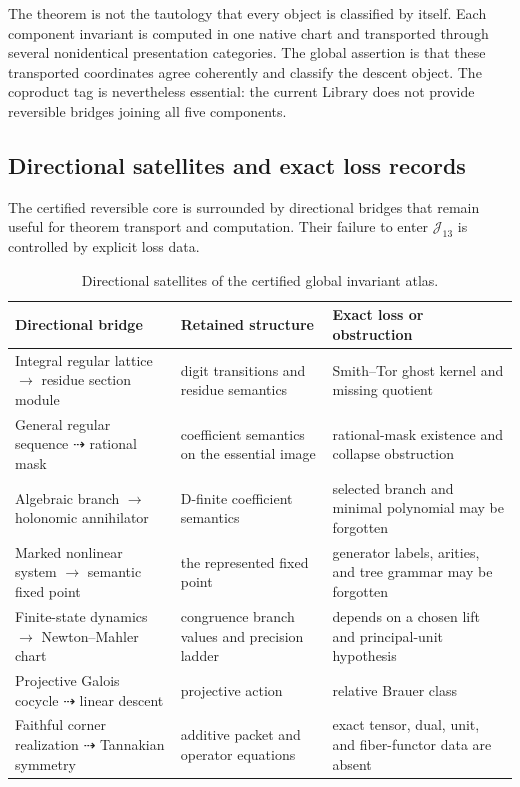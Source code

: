 \begin{remark}
The theorem is not the tautology that every object is classified by itself.  Each component invariant is computed in one native chart and transported through several nonidentical presentation categories.  The global assertion is that these transported coordinates agree coherently and classify the descent object.  The coproduct tag is nevertheless essential: the current Library does not provide reversible bridges joining all five components.
\end{remark}

\subsection{Directional satellites and exact loss records}
\label{subsec:block13-directional-satellites}

The certified reversible core is surrounded by directional bridges that remain useful for theorem transport and computation.  Their failure to enter \(\mathcal J_{13}\) is controlled by explicit loss data.

\begin{table}[htbp]
\centering
\caption{Directional satellites of the certified global invariant atlas.}
\label{tab:block13-directional-satellites}
\small
\begin{tabularx}{\textwidth}{@{}L{0.23\textwidth}L{0.19\textwidth}Y@{}}
\toprule
Directional bridge & Retained structure & Exact loss or obstruction\\
\midrule
Integral regular lattice \(\to\) residue section module & digit transitions and residue semantics & Smith--Tor ghost kernel and missing quotient\\
General regular sequence \(\dashrightarrow\) rational mask & coefficient semantics on the essential image & rational-mask existence and collapse obstruction\\
Algebraic branch \(\to\) holonomic annihilator & D-finite coefficient semantics & selected branch and minimal polynomial may be forgotten\\
Marked nonlinear system \(\to\) semantic fixed point & the represented fixed point & generator labels, arities, and tree grammar may be forgotten\\
Finite-state dynamics \(\to\) Newton--Mahler chart & congruence branch values and precision ladder & depends on a chosen lift and principal-unit hypothesis\\
Projective Galois cocycle \(\dashrightarrow\) linear descent & projective action & relative Brauer class\\
Faithful corner realization \(\dashrightarrow\) Tannakian symmetry & additive packet and operator equations & exact tensor, dual, unit, and fiber-functor data are absent\\
\bottomrule
\end{tabularx}
\end{table}

